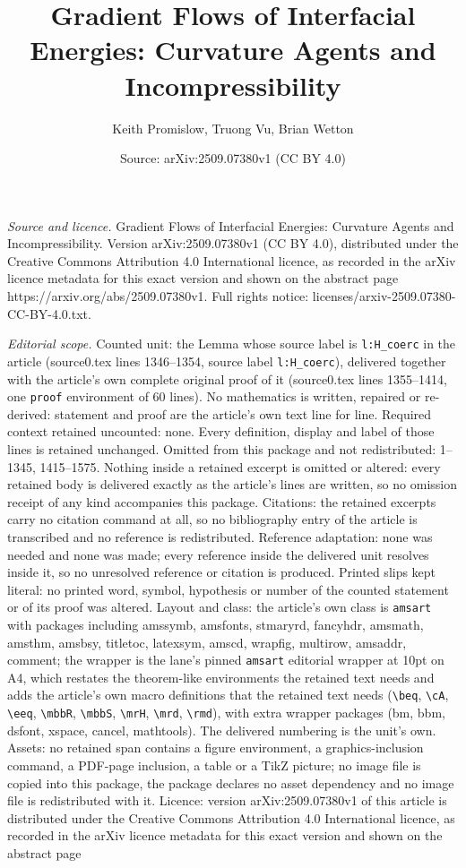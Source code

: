 \documentclass[10pt,a4paper]{amsart}
\title[Gradient Flows of Interfacial Energies: Curvature Agents and]{Gradient Flows of Interfacial Energies: Curvature Agents and Incompressibility}
\author{Keith Promislow, Truong Vu, Brian Wetton}
\date{Source: arXiv:2509.07380v1 (CC BY 4.0)}
\begin{document}
\maketitle

\noindent\emph{Source and licence.} Gradient Flows of Interfacial Energies: Curvature Agents and Incompressibility. Version arXiv:2509.07380v1 (CC BY 4.0), distributed under the Creative Commons Attribution 4.0 International licence, as recorded in the arXiv licence metadata for this exact version and shown on the abstract page https://arxiv.org/abs/2509.07380v1. Full rights notice: licenses/arxiv-2509.07380-CC-BY-4.0.txt.\par\smallskip

\noindent\textit{Editorial scope.} Counted unit: the Lemma whose source label is \texttt{l:H\_coerc} in the article (source0.tex lines 1346--1354, source label \texttt{l:H\_coerc}), delivered together with the article's own complete original proof of it (source0.tex lines 1355--1414, one \texttt{proof} environment of 60 lines). No mathematics is written, repaired or re-derived: statement and proof are the article's own text line for line. Required context retained uncounted: none. Every definition, display and label of those lines is retained unchanged. Omitted from this package and not redistributed: 1--1345, 1415--1575. Nothing inside a retained excerpt is omitted or altered: every retained body is delivered exactly as the article's lines are written, so no omission receipt of any kind accompanies this package. Citations: the retained excerpts carry no citation command at all, so no bibliography entry of the article is transcribed and no reference is redistributed. Reference adaptation: none was needed and none was made; every reference inside the delivered unit resolves inside it, so no unresolved reference or citation is produced. Printed slips kept literal: no printed word, symbol, hypothesis or number of the counted statement or of its proof was altered. Layout and class: the article's own class is \texttt{amsart} with packages including amssymb, amsfonts, stmaryrd, fancyhdr, amsmath, amsthm, amsbsy, titletoc, latexsym, amscd, wrapfig, multirow, amsaddr, comment; the wrapper is the lane's pinned \texttt{amsart} editorial wrapper at 10pt on A4, which restates the theorem-like environments the retained text needs and adds the article's own macro definitions that the retained text needs (\texttt{\textbackslash beq}, \texttt{\textbackslash cA}, \texttt{\textbackslash eeq}, \texttt{\textbackslash mbbR}, \texttt{\textbackslash mbbS}, \texttt{\textbackslash mrH}, \texttt{\textbackslash mrd}, \texttt{\textbackslash rmd}), with extra wrapper packages (bm, bbm, dsfont, xspace, cancel, mathtools). The delivered numbering is the unit's own. Assets: no retained span contains a figure environment, a graphics-inclusion command, a PDF-page inclusion, a table or a TikZ picture; no image file is copied into this package, the package declares no asset dependency and no image file is redistributed with it. Licence: version arXiv:2509.07380v1 of this article is distributed under the Creative Commons Attribution 4.0 International licence, as recorded in the arXiv licence metadata for this exact version and shown on the abstract page 
\end{document}
